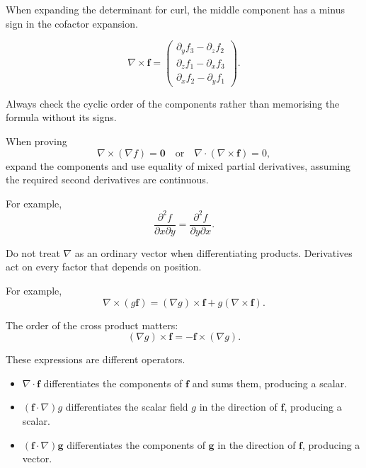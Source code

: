 \begin{mistake}
  When expanding the determinant for curl, the middle component has a minus sign in the cofactor expansion.

  \[
  \nabla\times\boldsymbol{f}
  =
  \begin{pmatrix}
  \partial_y f_3-\partial_z f_2\\
  \partial_z f_1-\partial_x f_3\\
  \partial_x f_2-\partial_y f_1
  \end{pmatrix}.
  \]

  Always check the cyclic order of the components rather than memorising the formula without its signs.
\end{mistake}

\begin{mistake}
  When proving
  \[
  \nabla\times(\nabla f)=\boldsymbol{0}
  \quad\text{or}\quad
  \nabla\cdot(\nabla\times\boldsymbol{f})=0,
  \]
  expand the components and use equality of mixed partial derivatives, assuming the required second derivatives are continuous.

  For example,
  \[
  \frac{\partial^2 f}{\partial x\partial y}
  =
  \frac{\partial^2 f}{\partial y\partial x}.
  \]
\end{mistake}

\begin{mistake}
  Do not treat $\nabla$ as an ordinary vector when differentiating products. Derivatives act on every factor that depends on position.

  For example,
  \[
  \nabla\times(g\boldsymbol{f})
  =(\nabla g)\times\boldsymbol{f}
  +g(\nabla\times\boldsymbol{f}).
  \]

  The order of the cross product matters:
  \[
  (\nabla g)\times\boldsymbol{f}
  =-\boldsymbol{f}\times(\nabla g).
  \]
\end{mistake}

\begin{mistake}
  These expressions are different operators.

  \begin{itemize}
    \item $\nabla\cdot\boldsymbol{f}$ differentiates the components of $\boldsymbol{f}$ and sums them, producing a scalar.
    \item $(\boldsymbol{f}\cdot\nabla)g$ differentiates the scalar field $g$ in the direction of $\boldsymbol{f}$, producing a scalar.
    \item $(\boldsymbol{f}\cdot\nabla)\boldsymbol{g}$ differentiates the components of $\boldsymbol{g}$ in the direction of $\boldsymbol{f}$, producing a vector.
  \end{itemize}
\end{mistake}

